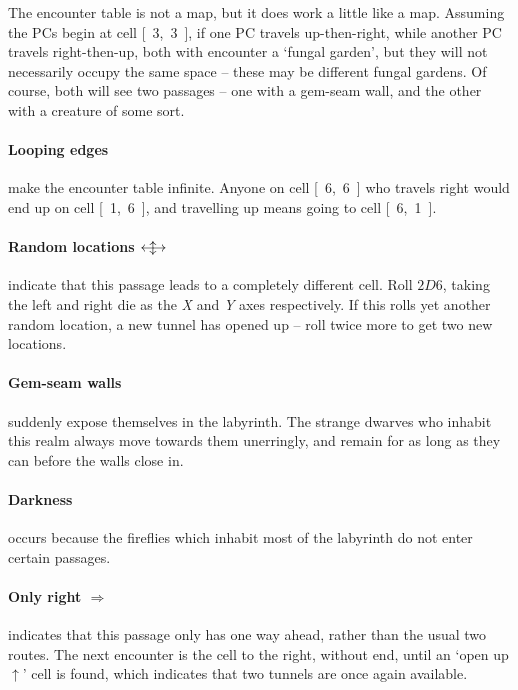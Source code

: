 \begin{multicols}{2}
The encounter table is not a map, but it does work a little like a map.
Assuming the PCs begin at cell \mbox{[ 3, 3 ]}, if one PC travels up-then-right, while another PC travels right-then-up, both with encounter a `fungal garden', but they will not necessarily occupy the same space -- these may be different fungal gardens.
Of course, both will see two passages -- one with a gem-seam wall, and the other with a creature of some sort.

\paragraph{Looping edges}
make the encounter table infinite.
Anyone on cell \mbox{[ 6, 6 ]} who travels right would end up on cell \mbox{[ 1, 6 ]}, and travelling up means going to cell \mbox{[ 6, 1 ]}.

\paragraph{Random locations $\longleftrightarrow\hspace{-1.2em}\updownarrow$}
indicate that this passage leads to a completely different cell.
Roll $2D6$, taking the left and right die as the \textit{X} and \textit{Y} axes respectively.
If this rolls yet another random location, a new tunnel has opened up -- roll twice more to get two new locations.

\paragraph{Gem-seam walls}
suddenly expose themselves in the labyrinth.
The strange dwarves who inhabit this realm always move towards them unerringly, and remain for as long as they can before the walls close in.

\paragraph{Darkness}
occurs because the fireflies which inhabit most of the labyrinth do not enter certain passages.

\paragraph{Only right $\Rightarrow$}
indicates that this passage only has one way ahead, rather than the usual two routes.
The next encounter is the cell to the right, without end, until an `open up $\uparrow$' cell is found,  which indicates that two tunnels are once again available.


\end{multicols}
